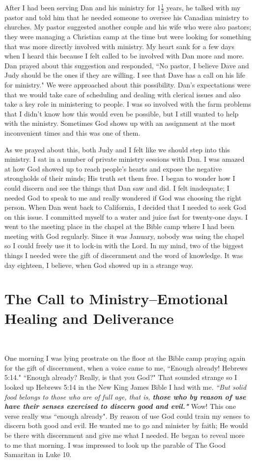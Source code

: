 \documentclass[oneside,12pt]{book}
\begin{document}
After I had been serving Dan and his ministry for 1$\frac{1}{2}$ years, he talked with my pastor and told him that he needed someone to oversee his Canadian ministry to churches. My pastor suggested another couple and his wife who were also pastors; they were managing a Christian camp at the time but were looking for something that was more directly involved with ministry. My heart sank for a few days when I heard this because I felt called to be involved with Dan more and more. Dan prayed about this suggestion and responded, ``No pastor, I believe Dave and Judy should be the ones if they are willing. I see that Dave has a call on his life for ministry." We were approached about this possibility. Dan's expectations were that we would take care of scheduling and dealing with clerical issues and also take a key role in ministering to people. I was so involved with the farm problems that I didn't know how this would even be possible, but I still wanted to help with the ministry. Sometimes God shows up with an assignment at the most inconvenient times and this was one of them.


As we prayed about this, both Judy and I felt like we should step into this ministry. I sat in a number of private ministry sessions with Dan. I was amazed at how God showed up to reach people's hearts and expose the negative strongholds of their minds; His truth set them free. I began to wonder how I could discern and see the things that Dan saw and did. I felt inadequate; I needed God to speak to me and really wondered if God was choosing the right person. When Dan went back to California, I decided that I needed to seek God on this issue. I committed myself to a water and juice fast for twenty-one days. I went to the meeting place in the chapel at the Bible camp where I had been meeting with God regularly. Since it was January, nobody was using the chapel so I could freely use it to lock-in with the Lord. In my mind, two of the biggest things I needed were the gift of discernment and the word of knowledge. It was day eighteen, I believe, when God showed up in a strange way.


\section{The Call to Ministry--Emotional Healing and Deliverance}
\

One morning I was lying prostrate on the floor at the Bible camp praying again for the gift of discernment, when a voice came to me, ``Enough already! Hebrews 5:14." ``Enough already? Really, is that you God?" That sounded strange so I looked up Hebrews 5:14 in the New King James Bible I had with me. \textit{``But solid food belongs to those who are of full age, that is, \textbf{those who by reason of use have their senses exercised to discern good and evil."}} Wow! This one verse really was ``enough already". By reason of use God could train my senses to discern both good and evil. He wanted me to go and minister by faith; He would be there with discernment and give me what I needed. He began to reveal more to me that morning. I was impressed to look up the parable of The Good Samaritan in Luke 10.
\end{document}
